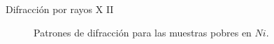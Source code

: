 \documentclass[11pt]{beamer}
\begin{document}
			\begin{frame}{Difracción por rayos X II}
				\begin{figure}[H]
					\captionsetup[subfloat]{labelformat=empty}
					 \qquad
					\caption*{Patrones de difracción para las muestras pobres en $Ni$.}
					\label{RXNiPoor}
				\end{figure}		
			\end{frame}
			
\end{document}
